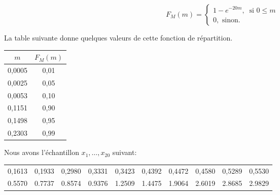\begin{questions}
 \begin{equation*}
  F_M(m) = \begin{cases}
         1-e^{-20m},\ \text{  si  } 0\leq m \\
        0, \text{ sinon.}
        \end{cases}
 \end{equation*}

La table suivante donne quelques valeurs de cette fonction de répartition.
\begin{table}[ht]
    \centering
\begin{tabular}{|cc|}
  \hline
 $m$ & $F_M(m)$ \\ 
  \hline
    0,0005 & 0,01 \\
    0,0025 & 0,05 \\
    0,0053 & 0,10 \\
    0,1151 & 0,90 \\
    0,1498 & 0,95 \\ 
    0,2303 & 0,99 \\ 
  \hline
\end{tabular}
\end{table}

Nous avons l'échantillon $x_1,\hdots,x_{20}$ suivant:

\begin{table}[ht]
\centering
\begin{tabular}{rrrrrrrrrr}
  \hline
0,1613 & 0,1933 & 0,2980 & 0,3331 & 0,3423 & 0,4392 & 0,4472 & 0,4580 & 0,5289 & 0,5530 \\ 
0.5570 & 0.7737 & 0.8574 & 0.9376 & 1.2509 & 1.4475 & 1.9064 & 2.6019 & 2.8685 & 2.9829 \\ 
   \hline
\end{tabular}
\end{table}


\end{questions}

 
